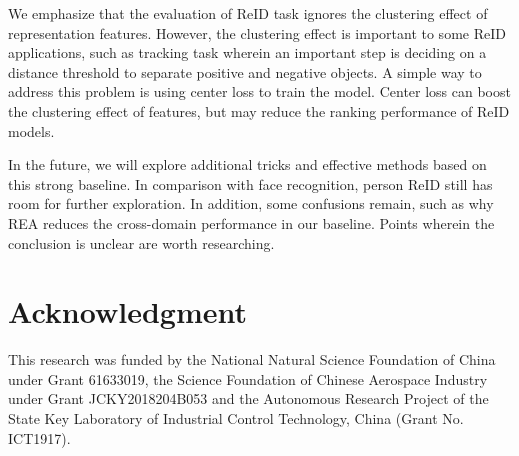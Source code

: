 \documentclass[journal]{IEEEtran}
\begin{document}
We emphasize that the evaluation of ReID task ignores the clustering effect of representation features. However, the clustering effect is important to some ReID applications, such as tracking task wherein an important step is deciding on a distance threshold to separate positive and negative objects. A simple way to address this problem is using center loss to train the model. Center loss can boost the clustering effect of features, but may reduce the ranking performance of ReID models.

In the future, we will explore additional tricks and effective methods based on this strong baseline. In comparison with face recognition, person ReID still has room for further exploration. In addition, some confusions remain, such as why REA reduces the cross-domain performance in our baseline. Points wherein the conclusion is unclear are worth researching.

\section*{Acknowledgment}

This research was funded by the National Natural Science Foundation of China under Grant 61633019, the Science Foundation of Chinese Aerospace Industry under Grant JCKY2018204B053 and the Autonomous Research Project of the State Key Laboratory of Industrial Control Technology, China (Grant No. ICT1917).



\ifCLASSOPTIONcaptionsoff
  \newpage
\fi

{}

\end{document}
